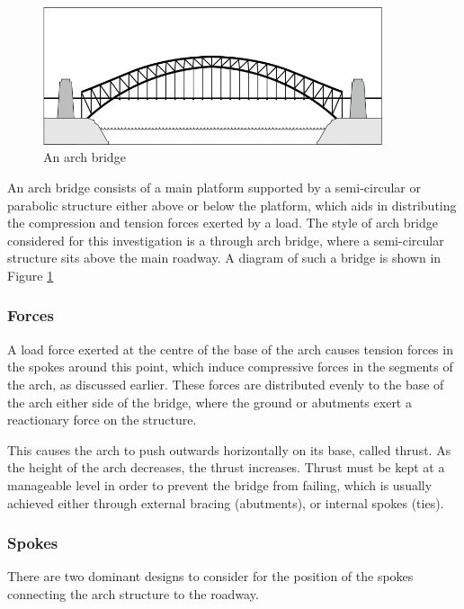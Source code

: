 \documentclass[a4paper,11pt]{article}
\begin{document}
\begin{figure}
\begin{center}
\includegraphics[width=10cm]{figures/arch-bridge.png}
\end{center}
\caption{An arch bridge}
\label{research:arch-bridge}
\end{figure}


An arch bridge consists of a main platform supported by a semi-circular or
parabolic structure either above or below the platform, which aids in
distributing the compression and tension forces exerted by a load.
The style of arch bridge considered for this investigation is a through arch
bridge, where a semi-circular structure sits above the main roadway.
A diagram of such a bridge is shown in Figure \ref{research:arch-bridge}


\subsubsection{Forces}

A load force exerted at the centre of the base of the arch causes tension forces
in the spokes around this point, which induce compressive forces in the segments
of the arch, as discussed earlier.
These forces are distributed evenly to the base of the arch either
side of the bridge, where the ground or abutments exert a reactionary force on
the structure.

This causes the arch to push outwards horizontally on its base, called thrust.
As the height of the arch decreases, the thrust increases.
Thrust must be kept at a manageable level in order to prevent the bridge from
failing, which is usually achieved either through external bracing (abutments),
or internal spokes (ties).


\subsubsection{Spokes}

There are two dominant designs to consider for the position of the spokes
connecting the arch structure to the roadway.
\end{document}
